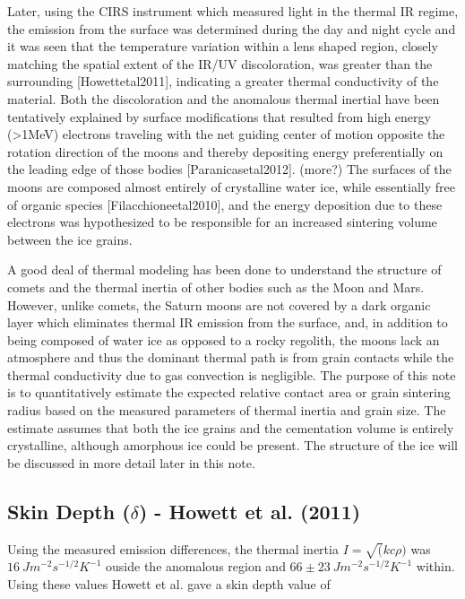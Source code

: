 \documentclass[11pt]{article} %
\begin{document}
	Later, using the CIRS instrument which measured light in the thermal IR regime, the emission from the surface was determined during the day and night cycle and it was seen that the temperature variation within a lens shaped region, closely matching the spatial extent of the IR/UV discoloration, was greater than the surrounding [Howettetal2011], indicating a greater thermal conductivity of the material. Both the discoloration and the anomalous thermal inertial have been tentatively explained by surface modifications that resulted from high energy (>1MeV) electrons traveling with the net guiding center of motion opposite the rotation direction of the moons and thereby depositing energy preferentially on the leading edge of those bodies [Paranicasetal2012]. (more?) The surfaces of the moons are composed almost entirely of crystalline water ice, while essentially free of organic species [Filacchioneetal2010], and the energy deposition due to these electrons was hypothesized to be responsible for an increased sintering volume between the ice grains.

	A good deal of thermal modeling has been done to understand the structure of comets and the thermal inertia of other bodies such as the Moon and Mars. However, unlike comets, the Saturn moons are not covered by a dark organic layer which eliminates thermal IR emission from the surface, and, in addition to being composed of water ice as opposed to a rocky regolith, the moons lack an atmosphere and thus the dominant thermal path is from grain contacts while the thermal conductivity due to gas convection is negligible. The purpose of this note is to quantitatively estimate the expected relative contact area or grain sintering radius based on the measured parameters of thermal inertia and grain size. The estimate assumes that both the ice grains and the cementation volume is entirely crystalline, although amorphous ice could be present. The structure of the ice will be discussed in more detail later in this note. 

\subsection{Skin Depth ($\delta$) - Howett et al. (2011)}

	Using the measured emission differences, the thermal inertia $I=\sqrt(kc\rho)$ was $16 \: J m^{-2} s^{-1/2} K^{-1}$ ouside the anomalous region and $66 \pm 23 \: J m^{-2} s^{-1/2} K^{-1}$ within.  Using these values Howett et al. gave a skin depth value of 
	
\end{document}
